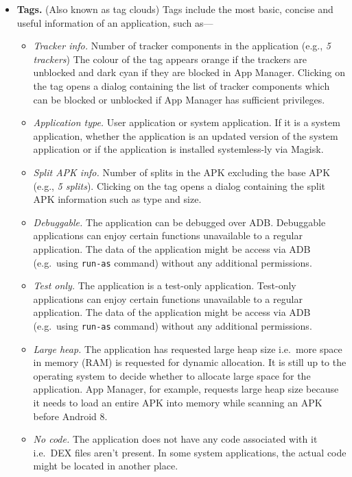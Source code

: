 \begin{itemize}
    \item \textbf{Tags.} (Also known as tag clouds) Tags include the most basic, concise and useful information of an
    application, such as---
    \begin{itemize}
        \item \textit{Tracker info.} Number of tracker components in the application (e.g., \textit{5 trackers}) The
        colour of the tag appears orange if the trackers are unblocked and dark cyan if they are blocked in App Manager.
        Clicking on the tag opens a dialog containing the list of tracker components which can be blocked or unblocked
        if App Manager has sufficient privileges.
        \item \textit{Application type.} User application or system application. If it is a system application, whether
        the application is an updated version of the system application or if the application is installed systemless-ly
        via Magisk.
        \item \textit{Split APK info.} Number of splits in the APK excluding the base APK (e.g., \textit{5 splits}).
        Clicking on the tag opens a dialog containing the split APK information such as type and size.
        \item \textit{Debuggable.} The application can be debugged over ADB\@. Debuggable applications can enjoy certain
        functions unavailable to a regular application. The data of the application might be access via ADB (e.g.\ using
        \texttt{run-as} command) without any additional permissions.
        \item \textit{Test only.} The application is a test-only application. Test-only applications can enjoy certain
        functions unavailable to a regular application. The data of the application might be access via ADB (e.g.\ using
        \texttt{run-as} command) without any additional permissions.
        \item \textit{Large heap.} The application has requested large heap size i.e.\ more space in memory (RAM) is
        requested for dynamic allocation. It is still up to the operating system to decide whether to allocate large
        space for the application. App Manager, for example, requests large heap size because it needs to load an entire
        APK into memory while scanning an APK before Android 8.
        \item \textit{No code.} The application does not have any code associated with it i.e.\ DEX files aren't present.
        In some system applications, the actual code might be located in another place.

\end{itemize}
\end{itemize}
